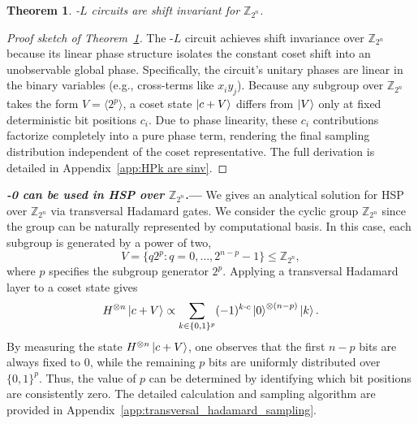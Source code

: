 \documentclass[reprint, aps, prl, superscriptaddress]{revtex4-2}
\renewcommand{\section}[1]{\par\medskip\noindent\textbf{{\textit{#1.}---}}}
\newcommand{\myqc}{\text{HP}}
\newtheorem{theorem}{Theorem}
\begin{document}

\begin{theorem}
\label{thm:hp_circuits_are_sinv}
    \myqc-$L$ circuits are shift invariant for $\mathbb{Z}_{2^{n}}$.
\end{theorem}

\begin{proof}[Proof sketch of Theorem~\ref{thm:hp_circuits_are_sinv}]
The \myqc{}-$L$ circuit achieves shift invariance over $\mathbb{Z}_{2^n}$ because its linear phase structure isolates the constant coset shift into an unobservable global phase. Specifically, the circuit's unitary phases are linear in the binary variables (e.g., cross-terms like $x_i y_j$). Because any subgroup over $\mathbb{Z}_{2^n}$ takes the form $V = \langle 2^p \rangle$, a coset state $\ket{c+V}$ differs from $\ket{V}$ only at fixed deterministic bit positions $c_i$. Due to phase linearity, these $c_i$ contributions factorize completely into a pure phase term, rendering the final sampling distribution independent of the coset representative. The full derivation is detailed in Appendix~\ref{app:HPk are sinv}.
\end{proof}


\section{\myqc-0 can be used in HSP over $\mathbb{Z}_{2^n}$}
We gives an analytical solution for HSP over $\mathbb{Z}_{2^n}$ via transversal Hadamard gates. We consider the cyclic group $\mathbb{Z}_{2^n}$ since the group can be naturally represented by computational basis. In this case, each subgroup is generated by a power of two,
\begin{equation}
    V=\{q2^p:q=0,\ldots,2^{n-p}-1\} \leq \mathbb{Z}_{2^n},
\label{eq: hp0 subgroup}
\end{equation}
where \(p\) specifies the subgroup generator \(2^p\). Applying a transversal Hadamard layer to a coset state gives
\begin{equation}
    H^{\otimes n}\ket{c+V}
    \propto
    \sum_{k\in\{0,1\}^{p}}(-1)^{k\cdot c}\ket{0}^{\otimes(n-p)}\ket{k}.
    \label{eq: hp0 after th}
\end{equation}
By measuring the state $H^{\otimes n}\ket{c+V}$, one observes that the first $n-p$ bits are always fixed to 0, while the remaining $p$ bits are uniformly distributed over $\{0,1\}^p$. Thus, the value of $p$ can be determined by identifying which bit positions are consistently zero. The detailed calculation and sampling algorithm are provided in Appendix~\ref{app:transversal_hadamard_sampling}.
\end{document}
